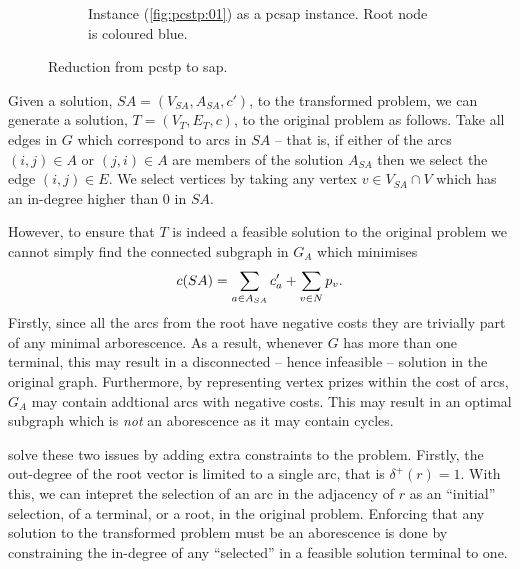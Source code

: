 \begin{figure}[h]
\begin{subfigure}[t]{0.47\linewidth}
    \caption{Instance (\ref{fig:pcstp:01}) as a \gls{pcsap} instance. Root node is coloured blue.}
  \end{subfigure}
  \caption{Reduction from \gls{pcstp} to \gls{sap}.}
  \label{fig:pcstptosap}
\end{figure}

Given a solution, $SA = (V_{SA}, A_{SA}, c')$,
to the transformed problem, we can generate a solution, $T = (V_T, E_T, c)$, to the
original problem as follows.
Take all edges in $G$ which correspond to arcs in $SA$ -- that is, if either of the arcs
$(i, j) \in A$ or $(j, i) \in A$ are members of the solution $A_{SA}$ then we select the edge $(i,j) \in E$.
We select vertices by taking any vertex $v \in V_{SA} \cap V$ which has an in-degree higher than 0 in
$SA$.

However, to ensure that $T$ is indeed a feasible solution to the original problem we
cannot simply find the connected subgraph in $G_A$ which minimises
$$c(SA) = \sum_{a \in A_{SA}} c'_{a} + \sum_{v \in N} p_v\mathnormal{.}$$
Firstly, since all the arcs from the root have negative costs they are trivially part of any minimal arborescence.
As a result, whenever $G$ has more than one terminal, this may result in a disconnected -- hence infeasible --
solution in the original graph.
Furthermore, by representing vertex prizes within the cost of arcs,
 $G_A$  may contain addtional arcs with negative costs. This may result in an
optimal subgraph which is \textit{not} an aborescence as it may contain cycles.

\citet{ljubic2005solving} solve these two issues by adding extra constraints to the problem. Firstly, the
out-degree of the root vector is limited to a single arc, that is $\delta^+(r) = 1$. With this,
we can intepret the selection of an arc in the adjacency of $r$ as an ``initial'' selection,
 of a terminal, or a root,
in the original problem. Enforcing that any solution to the transformed problem must be an aborescence
 is done by constraining the in-degree of any ``selected'' in a feasible solution terminal to one.

